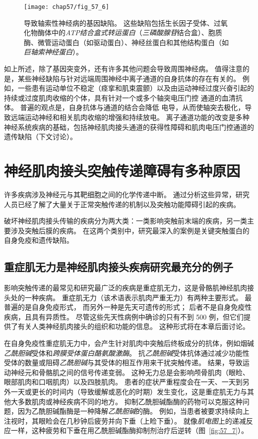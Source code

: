 \begin{figure}[htbp]
	\centering
	\texttt{[image: chap57/fig\_57\_6]}
	\caption{导致轴索性神经病的基因缺陷。
		这些缺陷包括生长因子受体、过氧化物酶体中的\textit{ATP结合盒式转运蛋白}（\textit{三磷酸腺苷}结合盒）、胞质酶、微管运动蛋白（如驱动蛋白）、神经丝蛋白和其他结构蛋白（如\textit{巨轴索神经蛋白}）\cite{brown2002inherited}。}
	\label{fig:57_6}
\end{figure}


如上所述，除了基因突变外，还有许多其他问题会导致周围神经病。
值得注意的是，某些神经缺陷与针对远端周围神经中离子通道的自身抗体的存在有关的。
例如，一些患有运动单位不稳定（痉挛和肌束震颤）以及由运动神经过度兴奋引起的持续或过度肌肉收缩的个体，具有针对一个或多个轴突电压门控  通道的血清抗体。
普遍的观点是，自身抗体与通道的结合会降低  电导，从而使轴突去极化，导致远端运动神经和相关肌肉收缩的增强和持续放电。
离子通道功能的改变是多种神经系统疾病的基础，包括神经肌肉接头通道的获得性障碍和肌肉电压门控通道的遗传缺陷（下文讨论）。



\section{神经肌肉接头突触传递障碍有多种原因}

许多疾病涉及神经元与其靶细胞之间的化学传递中断。
通过分析这些异常，研究人员已经了解了大量关于正常突触传递的机制以及突触功能障碍引起的疾病。


破坏神经肌肉接头传输的疾病分为两大类：一类影响突触前末端的疾病，另一类主要涉及突触后膜的疾病。
在这两个类别中，研究最深入的案例是关键突触蛋白的自身免疫和遗传缺陷。



\subsection{重症肌无力是神经肌肉接头疾病研究最充分的例子}

影响突触传递的最常见和研究最广泛的疾病是重症肌无力，这是骨骼肌神经肌肉接头处的一种疾病。
重症肌无力（该术语表示肌肉严重无力）有两种主要形式。
最普遍的是自身免疫形式，
而另外一种是先天可遗传的形式；
后者不是自身免疫性疾病，且具有异质性。
尽管这些先天性病例中确诊的只有不到 500 例，但它们提供了有关人类神经肌肉接头的组织和功能的信息。
这种形式将在本章后面讨论。


在自身免疫性重症肌无力中，会产生针对肌肉中突触后终板成分的抗体，例如烟碱\textit{乙酰胆碱}受体和\textit{跨膜受体蛋白酪氨酸激酶}。
抗\textit{乙酰胆碱}受体抗体通过减少功能性受体的数量或阻碍\textit{乙酰胆碱}与其受体的相互作用来干扰突触传递。
结果，导致运动神经元和骨骼肌之间的信号传递变弱。
这种无力总是会影响颅骨肌肉（眼睑、眼部肌肉和口咽肌肉）以及四肢肌肉。
患者的症状严重程度会在一天、一天到另外一天或更长的时间内（导致缓解或恶化的时期）发生变化，这是重症肌无力与其他大多数肌肉或神经疾病不同的地方。
抑制乙酰胆碱酯酶的药物可以克服这种问题，因为乙酰胆碱酯酶是一种降解\textit{乙酰胆碱}的酶。
例如，当患者被要求持续向上注视时，其眼睑会在几秒钟后疲劳并向下垂（上睑下垂）。
就像\textit{肌电图}上的递减反应一样，这种疲劳和下垂在用乙酰胆碱酯酶抑制剂治疗后逆转（图~\ref{fig:57_7}）。



